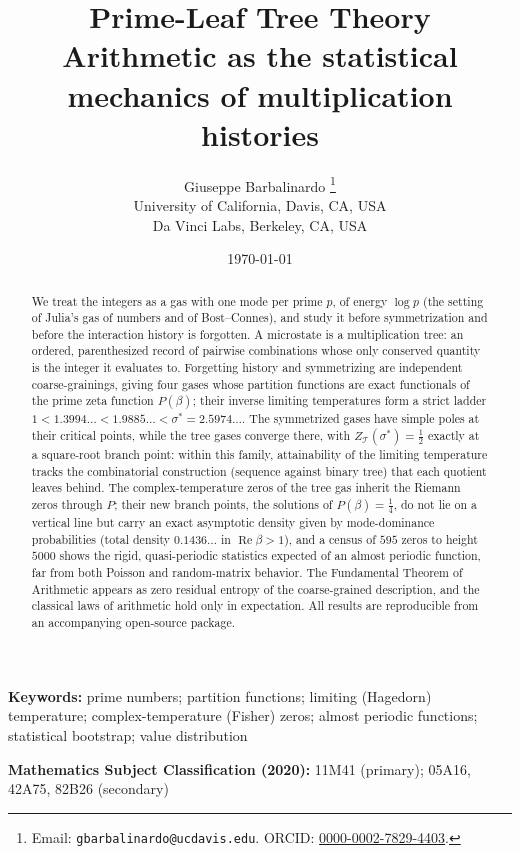 \documentclass[11pt]{article}
\title{Prime-Leaf Tree Theory\\[2mm]
\large Arithmetic as the statistical mechanics of multiplication histories}
\author{Giuseppe Barbalinardo%
\thanks{Email: \texttt{gbarbalinardo@ucdavis.edu}.
ORCID: \href{https://orcid.org/0000-0002-7829-4403}{0000-0002-7829-4403}.}\\[4pt]
\small University of California, Davis, CA, USA\\
\small Da Vinci Labs, Berkeley, CA, USA}
\date{\today}
\newcommand{\cT}{\mathcal{T}}   %
\numberwithin{equation}{section}
\theoremstyle{plain}
\theoremstyle{definition}
\theoremstyle{remark}
\begin{document}
\maketitle

\begin{abstract}
We treat the integers as a gas with one mode per prime $p$, of energy $\log p$ (the
setting of Julia's gas of numbers and of Bost--Connes), and study it before
symmetrization and before the interaction history is forgotten. A microstate
is a multiplication tree: an ordered, parenthesized record of pairwise combinations
whose only conserved quantity is the integer it evaluates to. Forgetting history and
symmetrizing are independent coarse-grainings, giving four gases whose partition
functions are exact functionals of the prime zeta function $P(\beta)$; their inverse
limiting temperatures form a strict ladder
$1 < 1.3994\ldots < 1.9885\ldots < \sigma^{*} = 2.5974\ldots$. The symmetrized
gases have simple poles at their critical points, while the tree gases converge
there, with $Z_\cT(\sigma^{*}) = \tfrac12$ exactly at a square-root branch point:
within this family, attainability of the limiting temperature tracks the
combinatorial construction (sequence against binary tree) that each quotient
leaves behind. The complex-temperature zeros of the tree gas
inherit the Riemann zeros through $P$; their new branch points, the solutions of
$P(\beta) = \tfrac14$, do not lie on a vertical line but carry an exact asymptotic
density given by mode-dominance probabilities (total density $0.1436\ldots$ in
$\operatorname{Re}\beta > 1$), and a census of $595$ zeros to height $5000$ shows
the rigid, quasi-periodic statistics expected of an almost periodic function, far
from both Poisson and random-matrix behavior. The Fundamental
Theorem of Arithmetic appears as zero residual entropy of the coarse-grained
description, and the classical laws of arithmetic hold only in expectation. All
results are reproducible from an accompanying open-source package.
\end{abstract}

\noindent\textbf{Keywords:} prime numbers; partition functions; limiting (Hagedorn)
temperature; complex-temperature (Fisher) zeros; almost periodic functions;
statistical bootstrap; value distribution

\medskip
\noindent\textbf{Mathematics Subject Classification (2020):} 11M41 (primary);
05A16, 42A75, 82B26 (secondary)

\tableofcontents

\end{document}
